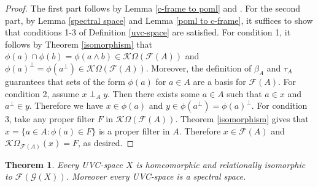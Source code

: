 \documentclass{amsart}
\theoremstyle{plain}
\newtheorem{theorem}{Theorem}[section]
\theoremstyle{definition}
\begin{document}
\begin{proof}
    The first part follows by Lemma \ref{c-frame to poml} and \cite[Lemma 4.1.2]{mcdonald}. For the second part, by Lemma \ref{spectral space} and Lemma \ref{poml to c-frame}, it suffices to show that conditions 1-3 of Definition \ref{uvc-space} are satisfied. For condition 1, it follows by Theorem \ref{isomorphism} that $\phi(a)\cap\phi(b)=\phi(a\wedge b)\in\mathcal{K}\Omega(\mathcal{F}(A))$ and $\phi(a)^{\perp}=\phi(a^{\perp})\in\mathcal{K}\Omega(\mathcal{F}(A))$. Moreover, the definition of $\beta_A$ and $\tau_A$ guarantees that sets of the form $\phi(a)$ for $a\in A$ are a basis for $\mathcal{F}(A)$. For condition 2, assume $x\perp_Ay$. Then there exists some $a\in A$ such that $a\in x$ and $a^{\perp}\in y$. Therefore we have $x\in\phi(a)$ and $y\in\phi(a^{\perp})=\phi(a)^{\perp}$. For condition 3, take any proper filter $F$ in $\mathcal{K}\Omega(\mathcal{F}(A))$. Theorem \ref{isomorphism} gives that $x=\{a\in A:\phi(a)\in F\}$ is a proper filter in $A$. Therefore $x\in\mathcal{F}(A)$ and $\mathcal{K}\Omega_{\mathcal{F}(A)}(x)=F$, as desired.    
\end{proof}
\begin{theorem}\label{homeomorphism}
    Every UVC-space $X$ is homeomorphic and relationally isomorphic to $\mathcal{F}(\mathcal{G}(X))$. Moreover every UVC-space is a spectral space.  
\end{theorem}
\end{document}
